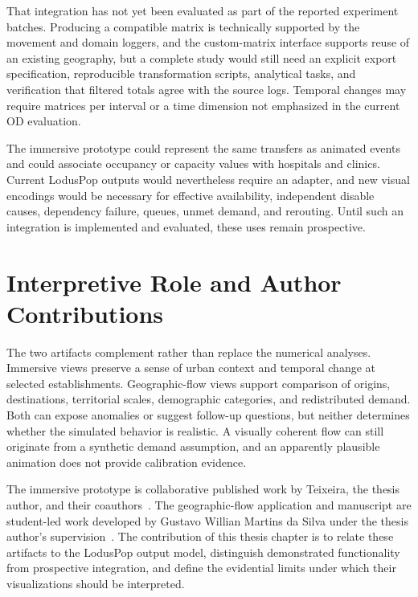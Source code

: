 That integration has not yet been evaluated as part of the reported experiment batches. Producing a compatible matrix is technically supported by the movement and domain loggers, and the custom-matrix interface supports reuse of an existing geography, but a complete study would still need an explicit export specification, reproducible transformation scripts, analytical tasks, and verification that filtered totals agree with the source logs. Temporal changes may require matrices per interval or a time dimension not emphasized in the current OD evaluation.

The immersive prototype could represent the same transfers as animated events and could associate occupancy or capacity values with hospitals and clinics. Current LodusPop outputs would nevertheless require an adapter, and new visual encodings would be necessary for effective availability, independent disable causes, dependency failure, queues, unmet demand, and rerouting. Until such an integration is implemented and evaluated, these uses remain prospective.

\section{Interpretive Role and Author Contributions}
\label{visualization:contribution}

The two artifacts complement rather than replace the numerical analyses. Immersive views preserve a sense of urban context and temporal change at selected establishments. Geographic-flow views support comparison of origins, destinations, territorial scales, demographic categories, and redistributed demand. Both can expose anomalies or suggest follow-up questions, but neither determines whether the simulated behavior is realistic. A visually coherent flow can still originate from a synthetic demand assumption, and an apparently plausible animation does not provide calibration evidence.

The immersive prototype is collaborative published work by Teixeira, the thesis author, and their coauthors~\cite{teixeira2024visualization}. The geographic-flow application and manuscript are student-led work developed by Gustavo Willian Martins da Silva under the thesis author's supervision~\cite{silva2026geospatial}. The contribution of this thesis chapter is to relate these artifacts to the LodusPop output model, distinguish demonstrated functionality from prospective integration, and define the evidential limits under which their visualizations should be interpreted.

